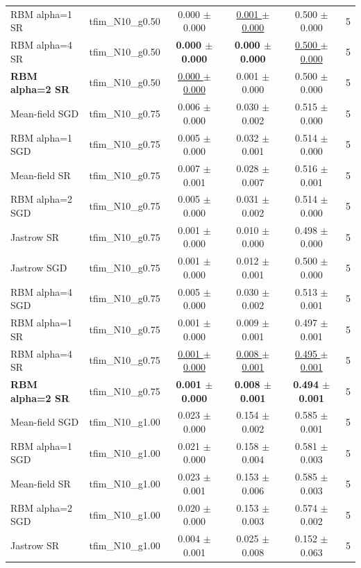 \begin{tabular}{llcccc}
RBM alpha=1 SR & tfim\_N10\_g0.50 & 0.000 $\pm$ 0.000 & \underline{0.001 $\pm$ 0.000} & 0.500 $\pm$ 0.000 & 5 \\
RBM alpha=4 SR & tfim\_N10\_g0.50 & \textbf{0.000 $\pm$ 0.000} & \textbf{0.000 $\pm$ 0.000} & \underline{0.500 $\pm$ 0.000} & 5 \\
\textbf{RBM alpha=2 SR} & tfim\_N10\_g0.50 & \underline{0.000 $\pm$ 0.000} & 0.001 $\pm$ 0.000 & 0.500 $\pm$ 0.000 & 5 \\
\midrule
Mean-field SGD & tfim\_N10\_g0.75 & 0.006 $\pm$ 0.000 & 0.030 $\pm$ 0.002 & 0.515 $\pm$ 0.000 & 5 \\
RBM alpha=1 SGD & tfim\_N10\_g0.75 & 0.005 $\pm$ 0.000 & 0.032 $\pm$ 0.001 & 0.514 $\pm$ 0.000 & 5 \\
Mean-field SR & tfim\_N10\_g0.75 & 0.007 $\pm$ 0.001 & 0.028 $\pm$ 0.007 & 0.516 $\pm$ 0.001 & 5 \\
RBM alpha=2 SGD & tfim\_N10\_g0.75 & 0.005 $\pm$ 0.000 & 0.031 $\pm$ 0.002 & 0.514 $\pm$ 0.000 & 5 \\
Jastrow SR & tfim\_N10\_g0.75 & 0.001 $\pm$ 0.000 & 0.010 $\pm$ 0.000 & 0.498 $\pm$ 0.000 & 5 \\
Jastrow SGD & tfim\_N10\_g0.75 & 0.001 $\pm$ 0.000 & 0.012 $\pm$ 0.001 & 0.500 $\pm$ 0.000 & 5 \\
RBM alpha=4 SGD & tfim\_N10\_g0.75 & 0.005 $\pm$ 0.000 & 0.030 $\pm$ 0.002 & 0.513 $\pm$ 0.001 & 5 \\
RBM alpha=1 SR & tfim\_N10\_g0.75 & 0.001 $\pm$ 0.000 & 0.009 $\pm$ 0.001 & 0.497 $\pm$ 0.001 & 5 \\
RBM alpha=4 SR & tfim\_N10\_g0.75 & \underline{0.001 $\pm$ 0.000} & \underline{0.008 $\pm$ 0.001} & \underline{0.495 $\pm$ 0.001} & 5 \\
\textbf{RBM alpha=2 SR} & tfim\_N10\_g0.75 & \textbf{0.001 $\pm$ 0.000} & \textbf{0.008 $\pm$ 0.001} & \textbf{0.494 $\pm$ 0.001} & 5 \\
\midrule
Mean-field SGD & tfim\_N10\_g1.00 & 0.023 $\pm$ 0.000 & 0.154 $\pm$ 0.002 & 0.585 $\pm$ 0.001 & 5 \\
RBM alpha=1 SGD & tfim\_N10\_g1.00 & 0.021 $\pm$ 0.000 & 0.158 $\pm$ 0.004 & 0.581 $\pm$ 0.003 & 5 \\
Mean-field SR & tfim\_N10\_g1.00 & 0.023 $\pm$ 0.001 & 0.153 $\pm$ 0.006 & 0.585 $\pm$ 0.003 & 5 \\
RBM alpha=2 SGD & tfim\_N10\_g1.00 & 0.020 $\pm$ 0.000 & 0.153 $\pm$ 0.003 & 0.574 $\pm$ 0.002 & 5 \\
Jastrow SR & tfim\_N10\_g1.00 & 0.004 $\pm$ 0.001 & 0.025 $\pm$ 0.008 & 0.152 $\pm$ 0.063 & 5 \\

\end{tabular}
